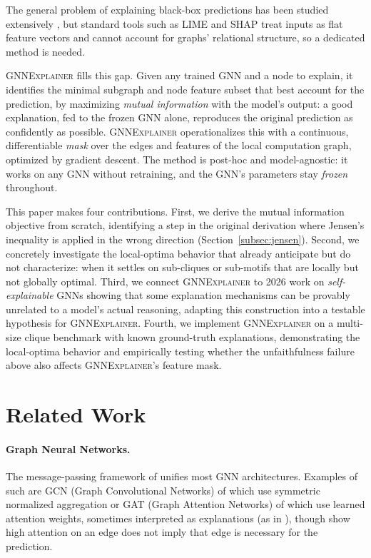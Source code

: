 \documentclass{article}
\newcommand{\GNNEx}{\textsc{GNNExplainer}\xspace}
\theoremstyle{definition}
\begin{document}
The general problem of explaining black-box predictions has been studied
extensively \citep{lipton2018mythos}, but standard tools such as LIME
\citep{ribeiro2016should} and SHAP \citep{lundberg2017unified} treat inputs as
flat feature vectors and cannot account for graphs' relational structure, so a
dedicated method is needed.

\GNNEx \citep{ying2019gnnexplainer} fills this gap. Given any trained GNN and a
node to explain, it identifies the minimal subgraph and node feature subset
that best account for the prediction, by maximizing \emph{mutual information}
with the model's output: a good explanation, fed to the frozen GNN alone,
reproduces the original prediction as confidently as possible. \GNNEx
operationalizes this with a continuous, differentiable \emph{mask} over the
edges and features of the local computation graph, optimized by gradient
descent. The method is post-hoc and model-agnostic: it works on any GNN
without retraining, and the GNN's parameters stay \emph{frozen} throughout.

This paper makes four contributions. First, we derive the mutual information
objective from scratch, identifying a step in the original derivation where
Jensen's inequality is applied in the wrong direction
(Section~\ref{subsec:jensen}). Second, we concretely investigate the
local-optima behavior that \citet{ying2019gnnexplainer} already anticipate
but do not characterize: when it settles on sub-cliques or sub-motifs that
are locally but not globally optimal. Third, we connect \GNNEx to 2026 work
on \emph{self-explainable} GNNs showing that some explanation mechanisms
can be provably unrelated to a model's actual reasoning, adapting this
construction into a testable hypothesis for \GNNEx. Fourth, we implement
\GNNEx on a multi-size clique benchmark with known ground-truth
explanations, demonstrating the local-optima behavior and empirically
testing whether the unfaithfulness failure above also affects \GNNEx's
feature mask.


\section{Related Work}
\label{sec:related}

\paragraph{Graph Neural Networks.}
The message-passing framework of \citet{gilmer2017neural} unifies most GNN
architectures. Examples of such are GCN (Graph Convolutional Networks) of \citet{kipf2017semi} which use symmetric normalized
aggregation or GAT (Graph Attention Networks) of \citet{velickovic2018graph} which use learned
attention weights, sometimes interpreted as explanations (as in \cite{ying2019gnnexplainer}), though
\citet{jain2019attention} show high attention on an edge does not imply that
edge is necessary for the prediction.
\end{document}

